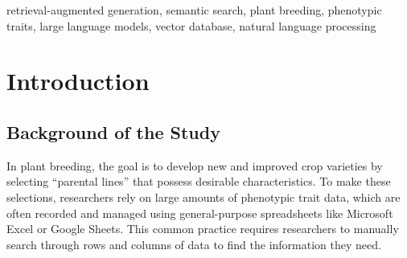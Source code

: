 \documentclass[journal]{./IEEE/IEEEtran}
\title{\SPTITLE}
\author{
  \ADVISEE,~%
  \ADVISER,~%
  Mark Anthony~L.~Parducho,~%
  Ayn Kristina~M.~Beltran,~%
  and~Maria Alma~B.~Sanchez%
  \REMARK
}
\begin{document}
\maketitle

\begin{abstract}
Plant breeding research currently relies on the manual analysis of extensive phenotypic trait data within spreadsheets, a method fundamentally limited by rigid, keyword-based search mechanisms. To address this, a Retrieval-Augmented Generation (RAG) system was designed and implemented, leveraging dense vector embeddings and a two-stage hybrid retrieval pipeline to facilitate natural language querying of phenotypic databases. This system was evaluated against a standard BM25 keyword baseline using 20 complex agricultural queries and standard information retrieval metrics. Quantitative results demonstrate that the hybrid approach outperforms lexical search in Precision@k, successfully navigating nuanced agricultural terminology where traditional keyword matching fails. Usability trials with research personnel further compared the AI-driven interface against established Microsoft Excel-based workflows, revealing a distinct reliability gap between system performance and user workflow expectations. Findings indicate researchers prioritize the deterministic precision and predictable accuracy of spreadsheet filters over the probabilistic "fuzziness" of semantic retrieval. Ultimately, this research concludes that while semantic search offers a scalable solution for data discovery, future agricultural information systems must adopt a filter-first co-pilot paradigm—leveraging AI to generate structured database filters before performing semantic retrieval—to ensure the exactitude required for scientific breeding decisions.
\end{abstract}

\begin{keywords}
retrieval-augmented generation, semantic search, plant breeding, phenotypic traits, large language models, vector database, natural language processing
\end{keywords}

\section{Introduction}

\subsection{Background of the Study}
In plant breeding, the goal is to develop new and improved crop varieties by selecting ``parental lines'' that possess desirable characteristics. To make these selections, researchers rely on large amounts of phenotypic trait data, which are often recorded and managed using general-purpose spreadsheets like Microsoft Excel or Google Sheets. This common practice requires researchers to manually search through rows and columns of data to find the information they need.
\end{document}
